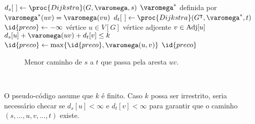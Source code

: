 \begin{minipage}{0.66\textwidth}
    \begin{codebox}

        \li $d_s[~] \Recebe \proc{Dijkstra}(G, \varomega, s)$
        \li \Seja $\varomega^*$ definida por $\varomega^*(u v) = \varomega(v u)$
        \li $d_t[~] \Recebe \proc{Dijkstra}(G^\intercal, \varomega^*, t)$
        \li
        \li $\id{preco} \Recebe -\infty$
        \li \Para \Cada vértice $u \in V[G]$ \Faca
            \Do
        \li     \Para \Cada vértice adjcente $v \in \operatorname{Adj}[u]$ \Faca
                \Do
        \li         \Se $d_s[u] + \varomega(u v) + d_t[v] \leq k$
                    \Do
        \li             \Entao $\id{preco} \Recebe \max\{\id{preco}, \varomega(u, v)\}$
                    \End
                \End
            \End
        \li \Devolva $\id{preco}$
    \end{codebox}
\end{minipage}%
\begin{minipage}{0.28\textwidth}
    \begin{figure}[H]
        \centering
        

        \caption{Menor caminho de $s$ a $t$ que passa pela aresta $u v$.}
        \label{fig:ex2}
    \end{figure}

    ~
\end{minipage}

O pseudo-código assume que $k$ é finito. Caso $k$ possa ser irrestrito, seria necessário checar se $d_s[u] < \infty$ e $d_t[v] < \infty$ para garantir que o caminho $(s, \ldots, u, v, \ldots, t)$ existe.
